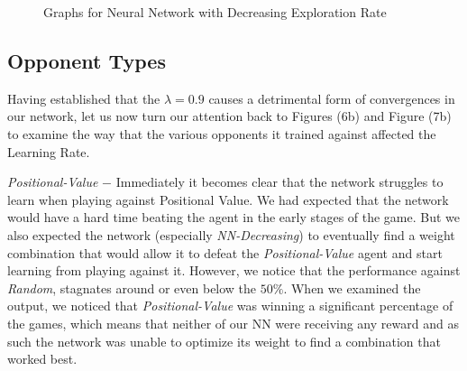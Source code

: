 \documentclass{sig-alternate-05-2015}
\begin{document}
\begin{figure}[p]
\centering
{}
\caption{Graphs for Neural Network with Decreasing Exploration Rate}
\label{fig:graph5}
\end{figure}


\subsection{Opponent Types}

	Having established that the $\lambda = 0.9$ causes a detrimental form of convergences in our network, let us now turn our attention back to Figures (6b) and Figure (7b) to examine the way that the various opponents it trained against affected the Learning Rate. 

\emph{Positional-Value} $-$ Immediately it becomes clear that the network struggles to learn when playing against Positional Value. We had expected that the network would have a hard time beating the agent in the early stages of the game. But we also expected the network (especially \emph{NN-Decreasing}) to eventually find a weight combination that would allow it to defeat the \emph{Positional-Value} agent and start learning from playing against it. However, we notice that the performance against \emph{Random}, stagnates around or even below the $50\%$. When we examined the output, we noticed that \emph{Positional-Value} was winning a significant percentage of the games, which means that neither of our NN were receiving any reward and as such the network was unable to optimize its weight to find a combination that worked best.
\end{document}
